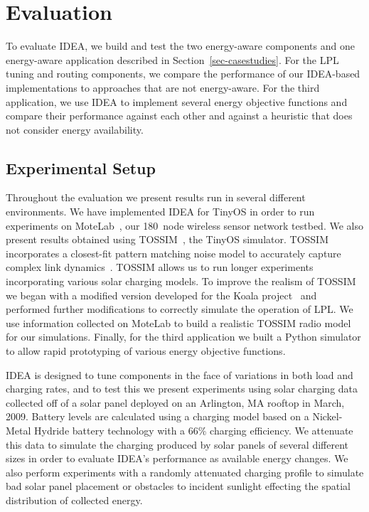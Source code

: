 \section{Evaluation}
\label{sec-evaluation}
\label{sec-eval}

To evaluate IDEA, we build and test the two energy-aware components and one
energy-aware application described in Section~\ref{sec-casestudies}. For the
LPL tuning and routing components, we compare the performance of our
IDEA-based implementations to approaches that are not energy-aware. For the
third application, we use IDEA to implement several energy objective
functions and compare their performance against each other and against a
heuristic that does not consider energy availability.

\vfill\eject

\subsection{Experimental Setup}
\label{subsec-experimentalsetup}

Throughout the evaluation we present results run in several different
environments. We have implemented IDEA for TinyOS in order to run experiments
on MoteLab~\cite{motelab}, our 180~node wireless sensor network testbed. We
also present results obtained using TOSSIM~\cite{tossim}, the TinyOS
simulator. TOSSIM incorporates a closest-fit pattern matching noise model to
accurately capture complex link dynamics~\cite{cpm-ipsn07}. TOSSIM allows us
to run longer experiments incorporating various solar charging models. To
improve the realism of TOSSIM we began with a modified version developed for
the Koala project~\cite{koala-ipsn08} and performed further modifications to
correctly simulate the operation of LPL. We use information collected on
MoteLab to build a realistic TOSSIM radio model for our simulations. Finally,
for the third application we built a Python simulator to allow rapid
prototyping of various energy objective functions.

IDEA is designed to tune components in the face of variations in both load
and charging rates, and to test this we present experiments using solar
charging data collected off of a solar panel deployed on an Arlington, MA
rooftop in March, 2009. Battery levels are calculated using a charging model
based on a Nickel-Metal Hydride battery technology with a 66\% charging
efficiency. We attenuate this data to simulate the charging produced by solar
panels of several different sizes in order to evaluate IDEA's performance as
available energy changes. We also perform experiments with a randomly
attenuated charging profile to simulate bad solar panel placement or
obstacles to incident sunlight effecting the spatial distribution of
collected energy.

